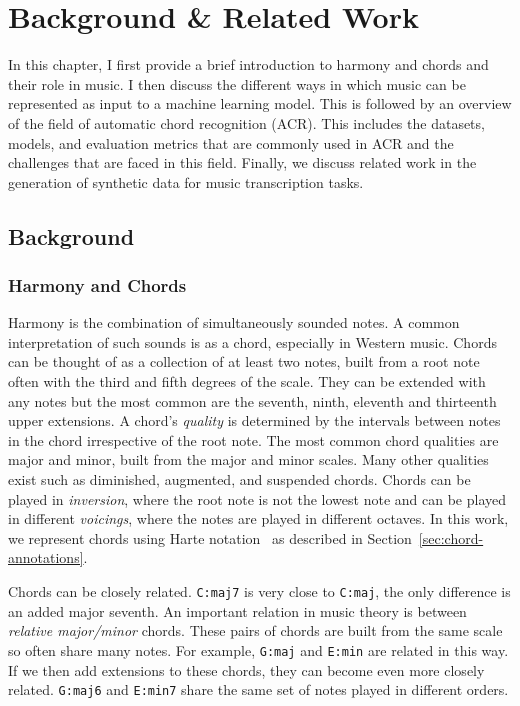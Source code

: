 \chapter{Background \& Related Work}

In this chapter, I first provide a brief introduction to harmony and chords and their role in music. I then discuss the different ways in which music can be represented as input to a machine learning model. This is followed by an overview of the field of automatic chord recognition (ACR). This includes the datasets, models, and evaluation metrics that are commonly used in ACR and the challenges that are faced in this field. Finally, we discuss related work in the generation of synthetic data for music transcription tasks.

\section{Background}

\subsection{Harmony and Chords}

Harmony is the combination of simultaneously sounded notes. A common interpretation of such sounds is as a chord,  especially in Western music. Chords can be thought of as a collection of at least two notes, built from a root note often with the third and fifth degrees of the scale. They can be extended with any notes but the most common are the seventh, ninth, eleventh and thirteenth upper extensions. A chord's \emph{quality} is determined by the intervals between notes in the chord irrespective of the root note. The most common chord qualities are major and minor, built from the major and minor scales. Many other qualities exist such as diminished, augmented, and suspended chords. Chords can be played in \emph{inversion}, where the root note is not the lowest note and can be played in different \emph{voicings}, where the notes are played in different octaves. In this work, we represent chords using Harte notation~\citep{HarteNotation} as described in Section~\ref{sec:chord-annotations}.

Chords can be closely related. \texttt{C:maj7} is very close to \texttt{C:maj}, the only difference is an added major seventh. An important relation in music theory is between \emph{relative major/minor} chords. These pairs of chords are built from the same scale so often share many notes. For example, \texttt{G:maj} and \texttt{E:min} are related in this way. If we then add extensions to these chords, they can become even more closely related. \texttt{G:maj6} and \texttt{E:min7} share the same set of notes played in different orders.

